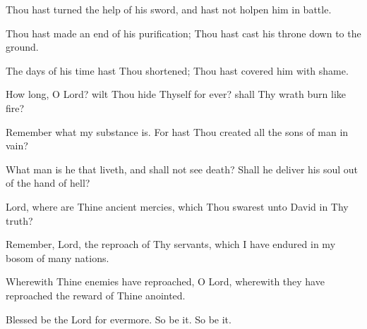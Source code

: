 Thou hast turned the help of his sword, and hast not holpen him in battle.

Thou hast made an end of his purification; Thou hast cast his throne down to the ground.

The days of his time hast Thou shortened;  Thou hast covered him with shame.

How long, O Lord? wilt Thou hide Thyself for ever? shall Thy wrath burn like fire?

Remember what my substance is. For hast Thou created all the sons of man in vain?

What man is he that liveth, and shall not see death? Shall he deliver his soul out of the hand of hell?

Lord, where are Thine ancient mercies, which Thou swarest unto David in Thy truth?

Remember, Lord, the reproach of Thy servants, which I have endured in my bosom of many nations.

Wherewith Thine enemies have reproached, O Lord, wherewith they have reproached the reward of Thine anointed.

Blessed be the Lord for evermore. So be it. So be it.

